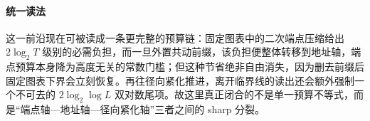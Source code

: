 

\paragraph{统一读法}
这一前沿现在可被读成一条更完整的预算链：固定图表中的二次端点压缩给出 \(2\log_2T\) 级别的必需负担，而一旦外置共动前缀，该负担便整体转移到地址轴，端点预算本身降为高度无关的常数门槛；但这种节省绝非自由消失，因为删去前缀后固定图表下界会立刻恢复。再往径向紧化推进，离开临界线的读出还会额外强制一个不可去的 \(2\log_2\log L\) 双对数尾项。故这里真正闭合的不是单一预算不等式，而是“端点轴—地址轴—径向紧化轴”三者之间的 sharp 分裂。

\endinput
